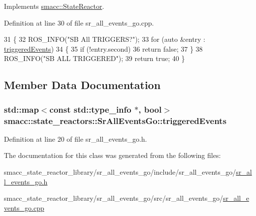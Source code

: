 Implements \hyperlink{classsmacc_1_1StateReactor_a445bc3c90980d75d7d815b85cfb68b21}{smacc\+::\+State\+Reactor}.



Definition at line 30 of file sr\+\_\+all\+\_\+events\+\_\+go.\+cpp.


\begin{DoxyCode}
31 \{
32     ROS\_INFO(\textcolor{stringliteral}{"SB All TRIGGERS?"});
33     \textcolor{keywordflow}{for} (\textcolor{keyword}{auto} &entry : \hyperlink{classsmacc_1_1state__reactors_1_1SrAllEventsGo_a2c3d7c7e15ed155ae6e83fe49e7897e9}{triggeredEvents})
34     \{
35         \textcolor{keywordflow}{if} (!entry.second)
36             \textcolor{keywordflow}{return} \textcolor{keyword}{false};
37     \}
38     ROS\_INFO(\textcolor{stringliteral}{"SB ALL TRIGGERED"});
39     \textcolor{keywordflow}{return} \textcolor{keyword}{true};
40 \}
\end{DoxyCode}


\subsection{Member Data Documentation}
\subsubsection[{\texorpdfstring{triggered\+Events}{triggeredEvents}}]{\setlength{\rightskip}{0pt plus 5cm}std\+::map$<$const std\+::type\+\_\+info $\ast$, {\bf bool}$>$ smacc\+::state\+\_\+reactors\+::\+Sr\+All\+Events\+Go\+::triggered\+Events\hspace{0.3cm}{\ttfamily [private]}}\hypertarget{classsmacc_1_1state__reactors_1_1SrAllEventsGo_a2c3d7c7e15ed155ae6e83fe49e7897e9}{}\label{classsmacc_1_1state__reactors_1_1SrAllEventsGo_a2c3d7c7e15ed155ae6e83fe49e7897e9}


Definition at line 20 of file sr\+\_\+all\+\_\+events\+\_\+go.\+h.



The documentation for this class was generated from the following files\+:\begin{DoxyCompactItemize}
\item 
smacc\+\_\+state\+\_\+reactor\+\_\+library/sr\+\_\+all\+\_\+events\+\_\+go/include/sr\+\_\+all\+\_\+events\+\_\+go/\hyperlink{sr__all__events__go_8h}{sr\+\_\+all\+\_\+events\+\_\+go.\+h}\item 
smacc\+\_\+state\+\_\+reactor\+\_\+library/sr\+\_\+all\+\_\+events\+\_\+go/src/sr\+\_\+all\+\_\+events\+\_\+go/\hyperlink{sr__all__events__go_8cpp}{sr\+\_\+all\+\_\+events\+\_\+go.\+cpp}\end{DoxyCompactItemize}
